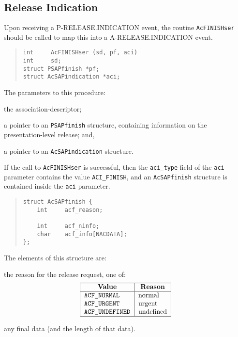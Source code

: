 \subsection	{Release Indication}
Upon receiving a {\sf P-RELEASE.INDICATION\/} event,
the routine \verb"AcFINISHser" should be called to map this into a
{\sf A-RELEASE.INDICATION\/} event.
\begin{quote}\small\begin{verbatim}
int     AcFINISHser (sd, pf, aci)
int     sd;
struct PSAPfinish *pf;
struct AcSAPindication *aci;
\end{verbatim}\end{quote}
The parameters to this procedure:
\begin{describe}
\item[\verb"sd":] the association-descriptor;

\item[\verb"pa":] a pointer to an \verb"PSAPfinish" structure,
containing information on the presentation-level release;
and,

\item[\verb"aci":] a pointer to an \verb"AcSAPindication" structure.
\end{describe}
If the call to \verb"AcFINISHser" is successful,
then the \verb"aci_type" field of the \verb"aci" parameter contains the value
\verb"ACI_FINISH",
and an \verb"AcSAPfinish" structure is contained inside the \verb"aci"
parameter.
\begin{quote}\small\begin{verbatim}
struct AcSAPfinish {
    int     acf_reason;

    int     acf_ninfo;
    char    acf_info[NACDATA];
};
\end{verbatim}\end{quote}
The elements of this structure are:
\begin{describe}
\item[\verb"acf\_reason":]	the reason for the release request,
one of:
\[\begin{tabular}{|l|l|}
\hline
    \multicolumn{1}{|c|}{\bf Value}&
		\multicolumn{1}{c|}{\bf Reason}\\
\hline
    \tt ACF\_NORMAL&	normal\\
    \tt ACF\_URGENT&	urgent\\
    \tt ACF\_UNDEFINED&	undefined\\
\hline
\end{tabular}\]

\item[\verb"acf\_info"/\verb"acf\_ninfo":]	any final data
(and the length of that data).
\end{describe}
